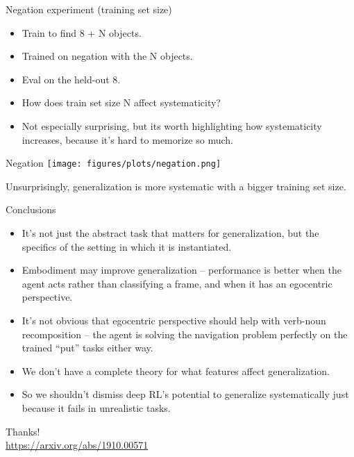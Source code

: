 \documentclass{beamer}
\begin{document}
\begin{frame}{Negation experiment (training set size)}
\begin{itemize}
\item Train to find 8 + N objects.
\item Trained on negation with the N objects.
\item Eval on the held-out 8.
\item How does train set size N affect systematicity?
\item Not especially surprising, but its worth highlighting how systematicity increases, because it's hard to memorize so much.
\end{itemize}
\end{frame}

\begin{frame}{Negation}
\vspace{1em}
\centering
\texttt{[image: figures/plots/negation.png]}
\end{frame}

\begin{frame}[standout]
Unsurprisingly, generalization is more systematic with a bigger training set size.
\end{frame}

\begin{frame}{Conclusions}
\begin{itemize}
\item It's not just the abstract task that matters for generalization, but the specifics of the setting in which it is instantiated. 
\item Embodiment may improve generalization -- performance is better when the agent acts rather than classifying a frame, and when it has an egocentric perspective.
\item It's not obvious that egocentric perspective should help with verb-noun recomposition -- the agent is solving the navigation problem perfectly on the trained ``put'' tasks either way.
\item We don't have a complete theory for what features affect generalization.
\item So we shouldn't dismiss deep RL's potential to generalize systematically just because it fails in unrealistic tasks. 
\end{itemize}
\end{frame}

\begin{frame}[standout]
Thanks!\\
\url{https://arxiv.org/abs/1910.00571}
\end{frame}
\end{document}
